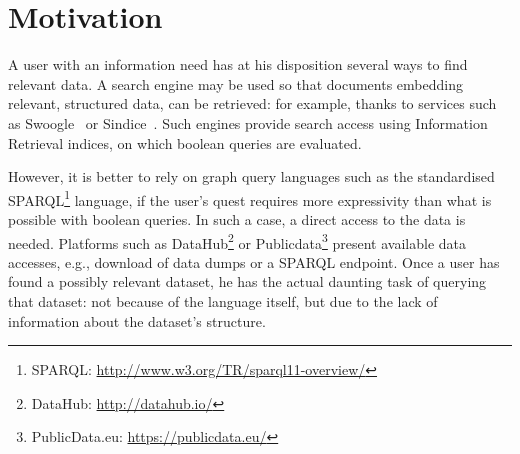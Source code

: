 
\section{Motivation}
\label{chap1:introduction:motivation}

%

A user with an information need has at his disposition several ways to find relevant data. A search engine may be used so that documents embedding relevant, structured data, can be retrieved: for example, thanks to services such as Swoogle~\cite{ding:2004:ssm} or Sindice~\cite{oren:2008:sdl}. Such engines provide search access using Information Retrieval indices, on which boolean queries are evaluated.

However, it is better to rely on graph query languages such as the standardised SPARQL\footnote{SPARQL: \url{http://www.w3.org/TR/sparql11-overview/}} language, if the user's quest requires more expressivity than what is possible with boolean queries. In such a case, a direct access to the data is needed. Platforms such as DataHub\footnote{DataHub: \url{http://datahub.io/}} or Publicdata\footnote{PublicData.eu: \url{https://publicdata.eu/}} present available data accesses, e.g., download of data dumps or a SPARQL endpoint. Once a user has found a possibly relevant dataset, he has the actual daunting task of querying that dataset: not because of the language itself, but due to the lack of information about the dataset's structure.

